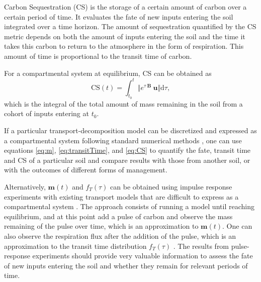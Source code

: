 \documentclass[11pt, oneside, a4paper]{article}   	%
\begin{document}
Carbon Sequestration (CS) is the storage of a certain amount of carbon over a certain period of time. It evaluates the fate of new inputs entering the soil integrated over a time horizon. The amount of sequestration quantified by the CS metric depends on both the amount of inputs entering the soil and the time it takes this carbon to return to the atmosphere in the form of respiration. This amount of time is proportional to the transit time of carbon. 


For a compartmental system at equilibrium, CS can be obtained as \citep{Sierra2021BGS}
\begin{equation} \label{eq:CS}
 \mathrm{CS}(t) = \int_{t_0}^t \Vert e^{\tau \ \mathbf{B}} \ \bm{u} \Vert \mathrm{d} \tau,
\end{equation}
which is the integral of the total amount of mass remaining in the soil from a cohort of inputs entering at $t_0$.

If a particular transport-decomposition model can be discretized and expressed as a compartmental system following standard numerical methods \citep{LeVeque2007, Lanczos}, one can use equations \ref{eq:m}, \ref{eq:transitTime}, and \ref{eq:CS} to quantify the fate, transit time and CS of a particular soil and compare results with those from another soil, or with the outcomes of different forms of management. 

Alternatively, $\bm{m}(t)$ and $f_T(\tau)$ can be obtained using impulse response experiments with existing transport models that are difficult to express as a compartmental system \citep{Thompson1999, Metzler2018MG}. The approach consists of running a model until reaching equilibrium, and at this point add a pulse of carbon and observe the mass remaining of the pulse over time, which is an approximation to $\bm{m}(t) $. One can also observe the respiration flux after the addition of the pulse, which is an approximation to the transit time distribution $f_T(\tau)$ \citep{Metzler2018MG}. The results from pulse-response experiments should provide very valuable information to assess the fate of new inputs entering the soil and whether they remain for relevant periods of time. 

\end{document}

